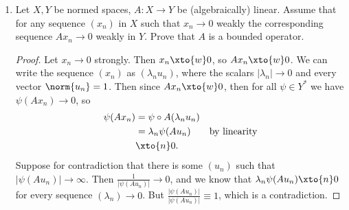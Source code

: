 \documentclass[12pt,letterpaper]{article}
\renewcommand{\epsilon}{\varepsilon}
\begin{document}
\begin{enumerate}
\begin{enumerate}
	\item Give an example of a separable $X_0$ such that $X_0^*$ is not separable. Prove the separability and non-separability of your
example.

	\answer $\ell_1$ is separable, and $\ell_1^*=\ell_\infty$ is not separable. 
	\begin{proof}[Proof ($\ell_1$ is separable)]
	let $A$ be the set of all finite rational sequences, that is, 
	$$A=\braces{\sum_{j=1}^n q_je_j \;:\; q_j\in\Q, n\in\N}.$$
	Then $A$ is countable since $\Q\times\N$ is countable, and it is dense in $\ell_1$ since we can use a similar strategy as in the previous problem to find, for any $\epsilon>0$, $q_j\in \Q$ such that 
	$$\norm{q_je_j-re_j}<\epsilon2^{-j}   $$
	for all elements of the form $ re_j$ in $\ell_1$, and so
	$$\norm{\sum_{j=1}^\infty q_je_j-\sum_{j=1}^\infty r_je_j}<\epsilon.$$
	 by triangle inequality for all $\sum_{j=1}^\infty r_je_j \in \ell_1$.
	\qedwhitehere
	\end{proof}
	\begin{proof}[Proof ($\ell_\infty$ is not separable)]
	Thinking of elements of $\ell_\infty$ as functions $\N\to\R$, consider the power set $\script{P}(\N)$. We can define a subset $\script{G}\subset\ell_\infty$ given by 
	$$\script{G}=\braces{\Chi_G(n) : G\in \script{P}(\N)},$$
	and we see that this set is uncountable, and no two sequences in $\script{G}$ are closer than 1, since they all differ by 1 at some $n$. Any countable subset of $\ell_\infty$ can only be within distance $1/2$ of at most countable many elements of $\script{G}$, so it cannot be dense. 
	\end{proof}
	\end{enumerate}
	
	
\item Let $X,Y$ be normed spaces, $A:X\to Y$ be (algebraically) linear. Assume that for any sequence $(x_n)$ in $X$ such that $x_n\to0$ weakly the corresponding sequence $Ax_n\to 0$ weakly in $Y$. Prove that $A$ is a bounded operator.
\begin{proof}
Let $x_n\to 0$ strongly. Then $x_n\xto{w}0$, so $Ax_n\xto{w}0$. We can write the sequence $(x_n)$ as $(\lambda_n u_n)$, where the scalars $|\lambda_n|\to0$ and every vector $\norm{u_n}=1$. Then since $Ax_n\xto{w}0$, then for all $\psi\in Y^*$ we have $\psi(Ax_n)\to 0$, so 
\begin{align*}
\psi(Ax_n)
&= \psi \circ	A(\lambda_nu_n) \\
&= \lambda_n \psi(Au_n) &\text{by linearity}\\
&\xto{n}0.
\end{align*}
Suppose for contradiction that there is some $(u_n)$ such that $|\psi(Au_n)|\to\infty$. Then $\frac{1}{|\psi(Au_n)|}\to0$, and we know that $\lambda_n \psi(Au_n) \xto{n}0$ for every sequence $(\lambda_n)\to0$. But $\frac{|\psi(Au_n)|}{|\psi(Au_n)|}\equiv1$, which is a contradiction.


\end{proof}
\end{enumerate}
\end{document}
